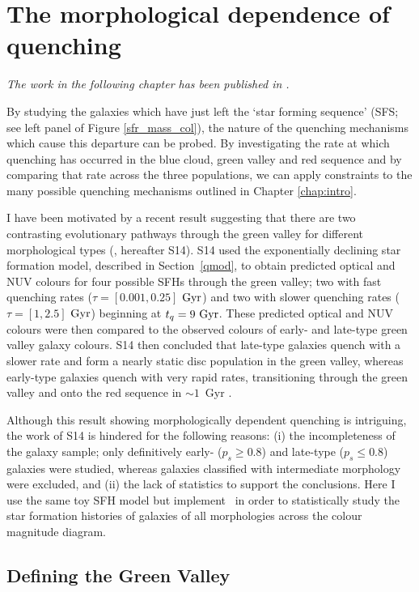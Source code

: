 \chapter{The morphological dependence of quenching}\label{chap:morph}

\emph{The work in the following chapter has been published in \citet{smethurst15}.}


By studying the galaxies which have just left the `star forming sequence' (SFS; see left panel of Figure \ref{sfr_mass_col}), the nature of the quenching mechanisms which cause this departure can be probed. By investigating the rate at which quenching has occurred in the blue cloud, green valley and red sequence and by comparing that rate across the three populations, we can apply constraints to the many possible quenching mechanisms outlined in Chapter \ref{chap:intro}. 

I have been motivated by a recent result suggesting that there are two contrasting evolutionary pathways through the green valley for different morphological types (\citealt{schawinski14}, hereafter S14). S14 used the exponentially declining star formation model, described in Section~\ref{qmod}, to obtain predicted optical and NUV colours for four possible SFHs through the green valley; two with fast quenching rates ($\tau = [0.001, 0.25]$ $\rm{Gyr}$) and two with slower quenching rates ($\tau = [1, 2.5]$ $\rm{Gyr}$) beginning at $t_q = 9~\rm{Gyr}$. These predicted optical and NUV colours were then compared to the observed colours of early- and late-type green valley galaxy colours. S14 then concluded that late-type galaxies quench with a slower rate and form a nearly static disc population in the green valley, whereas early-type galaxies quench with very rapid rates, transitioning through the green valley and onto the red sequence in $\sim 1$~Gyr \citep{Wong12}. 

Although this result showing morphologically dependent quenching is intriguing, the work of S14 is hindered for the following reasons: (i) the incompleteness of the galaxy sample; only definitively early- ($p_s \geq 0.8$) and late-type ($p_s \leq 0.8$) galaxies were studied, whereas galaxies classified with intermediate morphology were excluded, and (ii) the lack of statistics to support the conclusions. Here I use the same toy SFH model but implement \starpy ~in order to statistically study the star formation histories of galaxies of all morphologies across the colour magnitude diagram.


\section{Defining the Green Valley}\label{defGV}

